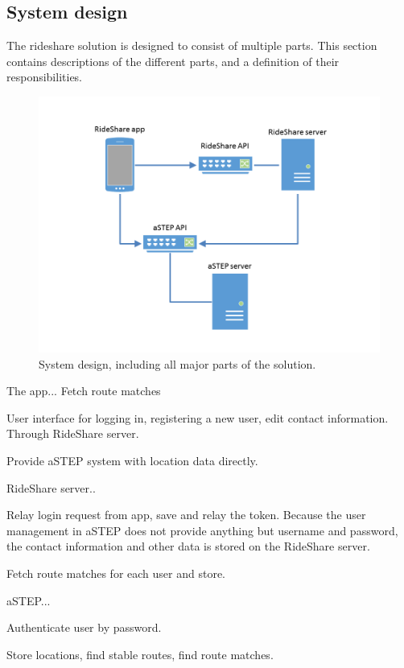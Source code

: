 \subsection{System design}
The rideshare solution is designed to consist of multiple parts.
This section contains descriptions of the different parts, and a definition of their responsibilities.

\begin{figure}[h]
	\centering
	\includegraphics[width=\textwidth]{figures/SystemDesign.png}
	\caption{System design, including all major parts of the solution.}
	\label{fig:s2systemdesign}
\end{figure}

The app...
Fetch route matches

User interface for logging in, registering a new user, edit contact information.
Through RideShare server.

Provide aSTEP system with location data directly.



RideShare server..

Relay login request from app, save and relay the token.
Because the user management in aSTEP does not provide anything but username and password, the contact information and other data is stored on the RideShare server.


Fetch route matches for each user and store.



aSTEP...

Authenticate user by password.

Store locations, find stable routes, find route matches.
